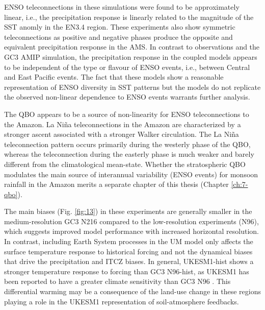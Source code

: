 ENSO teleconnections in these simulations were found to be approximately linear, i.e., the precipitation response is linearly related to the magnitude of the SST anomly in the EN3.4 region. These experiments also show symmetric teleconnections as positive and negative phases produce the opposite and equivalent precipitation response in the AMS. In contrast to observations and the GC3 AMIP simulation, the precipitation response in the coupled models appears to be independent of the type or flavour of ENSO events, i.e., between Central and East Pacific events. The fact that these models show a reasonable representation of ENSO diversity in SST patterns but the models  do not replicate the observed non-linear dependence to ENSO events warrants further analysis.

The QBO appears to be a source of non-linearity for ENSO teleconnections to the Amazon. La Niña  teleconnections in the Amazon are characterized by a stronger ascent associated with a stronger Walker circulation. The La Niña teleconnection pattern occurs primarily during the westerly phase of the QBO, whereas the teleconnection during the easterly phase is much weaker and barely different from the climatological mean-state. Whether the stratospheric QBO modulates the main source of interannual variability (ENSO events) for monsoon rainfall in the Amazon merits a separate chapter of this thesis (Chapter \ref{ch:7-qbo}). 

The main biases (Fig. \ref{fig:13}) in these experiments are generally smaller in the medium-resolution GC3 N216 compared to the low-resolution experiments (N96), which suggests improved model performance with increased horizontal resolution.
In contrast, including Earth System processes in the UM model only affects the surface temperature response to historical forcing and not the dynamical biases that drive the precipitation and ITCZ biases. 
 In general, UKESM1-hist shows a stronger temperature response to forcing than GC3 N96-hist, as UKESM1 has been reported to have a  greater climate sensitivity than GC3 N96 \citep{andrews2019,sellar2019}.  This differential warming may be a consequence of the land-use change in these regions playing a role in the UKESM1 representation of soil-atmosphere feedbacks. %


